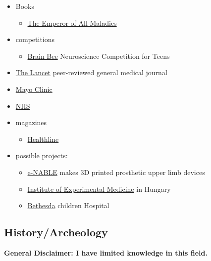 \documentclass{article}
\begin{document}
\begin{itemize}
    \item Books
    \begin{itemize}
        \item \href{https://www.goodreads.com/book/show/7170627-the-emperor-of-all-maladies}{The Emperor of All Maladies}
    \end{itemize}
    \item competitions
    \begin{itemize}
        \item \href{https://thebrainbee.org/}{Brain Bee} Neuroscience Competition for Teens
    \end{itemize}
    \item \href{https://www.thelancet.com/}{The Lancet} peer-reviewed general medical journal
    \item \href{https://www.mayoclinic.org/}{Mayo Clinic}
    \item \href{https://www.nhs.uk/}{NHS} 
    \item magazines
    \begin{itemize}
        \item \href{https://www.healthline.com/}{Healthline}
    \end{itemize}
    \item possible projects:
    \begin{itemize}
        \item \href{https://enablingthefuture.org/}{e-NABLE} makes 3D printed prosthetic upper limb devices
        \item \href{http://koki.hu/english}{Institute of Experimental Medicine} in Hungary
        \item \href{https://www.bethesda.hu/about-us/}{Bethesda} children Hospital
    \end{itemize}
\end{itemize}

\subsection{History/Archeology}
\textbf{General Disclaimer: I have limited knowledge in this field.}
\end{document}
